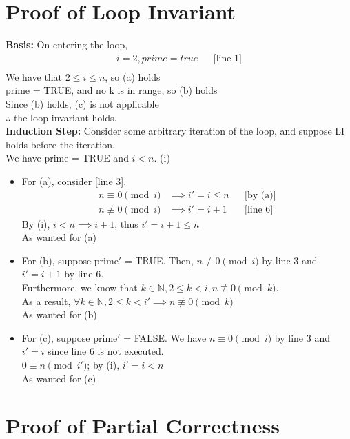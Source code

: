 \documentclass{article}
\begin{document}
	\section{Proof of Loop Invariant}
	\textbf{Basis:} On entering the loop,\\
	\begin{align*}
	i = 2, prime = true &&\text{[line 1]}\\
	\end{align*}
	We have that $2 \leq i \leq n$, so (a) holds\\
	prime = TRUE, and no k is in range, so (b) holds\\
	Since (b) holds, (c) is not applicable\\
	$\therefore$ the loop invariant holds.\\
	\textbf{Induction Step:} Consider some arbitrary iteration of the loop, and suppose LI holds before the iteration.\\
	We have prime = TRUE and $i<n$. (i)
	\begin{itemize}
		\item For (a), consider [line 3].\\
			\begin{align*}
				n \equiv 0 \pmod{i} &\implies i' = i \leq n &&\text{[by (a)]} \\
				n \not\equiv 0 \pmod{i} &\implies i' = i+1 &&\text{[line 6]}
			\end{align*}
			By (i), $i<n \implies i+1$, thus $i' = i+1 \leq n$ \\As wanted for (a)
		\item For (b), suppose prime$'$ = TRUE. Then, $n \not\equiv 0 \pmod{i}$ by line 3 and $i' = i+1$ by line 6.\\
			Furthermore, we know that $k \in \mathbb{N}, 2 \leq k < i, n \not\equiv 0 \pmod{k}$.\\
			As a result, $\forall k \in \mathbb{N}, 2 \leq k < i' \implies n \not\equiv 0 \pmod{k}$\\
			As wanted for (b)
		\item For (c), suppose prime$'$ = FALSE. We have $n \equiv 0 \pmod{i}$ by line 3 and $i' = i$ since line 6 is not executed.\\
			$0 \equiv n \pmod{i'}$; by (i), $i' = i < n$\\
			As wanted for (c)
	\end{itemize}
	\section{Proof of Partial Correctness}
	
\end{document}
